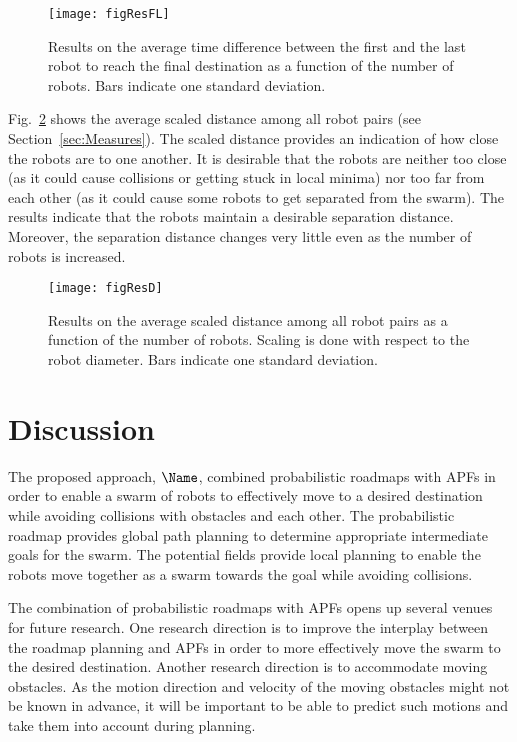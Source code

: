\begin{figure}
\centering
\texttt{[image: figResFL]}
\caption{Results on the average time difference between the first and
  the last robot to reach the
  final destination as a function of the number of robots. Bars
  indicate one standard deviation.}
\label{fig:ResFL}
\end{figure}

Fig.~\ref{fig:ResD} shows the average scaled distance among all robot
pairs (see Section~\ref{sec:Measures}). The scaled distance provides
an indication of how close the robots are to one another. It is
desirable that the robots are neither too close (as it could cause
collisions or getting stuck in local minima) nor too far from each
other (as it could cause some robots to get separated from the
swarm). The results indicate that the robots maintain a desirable
separation distance. Moreover, the separation distance changes very
little even as the number of robots is increased.

\begin{figure}
\centering
\texttt{[image: figResD]}
\caption{Results on the average scaled distance among all robot pairs
  as a function of the number of robots. Scaling is done with respect
  to the robot diameter. Bars
  indicate one standard deviation.}
\label{fig:ResD}
\end{figure}


\section{Discussion}

The proposed approach, $\Name$, combined probabilistic roadmaps with
APFs in order to enable a swarm of robots to effectively move to a
desired destination while avoiding collisions with obstacles and each
other.  The probabilistic roadmap provides global path planning to
determine appropriate intermediate goals for the swarm. The potential
fields provide local planning to enable the robots move together as a
swarm towards the goal while avoiding collisions.

The combination of probabilistic roadmaps with APFs opens up several
venues for future research. One research direction is to improve the
interplay between the roadmap planning and APFs in order to more
effectively move the swarm to the desired destination. Another
research direction is to accommodate moving obstacles. As the motion
direction and velocity of the moving obstacles might not be known in
advance, it will be important to be able to predict such motions
and take them into account during planning.




 



